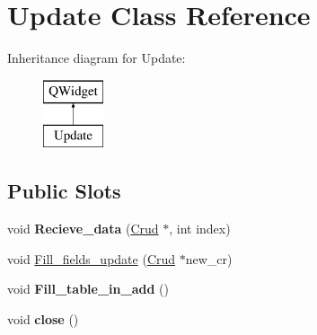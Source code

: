 \hypertarget{class_update}{}\section{Update Class Reference}
\label{class_update}
Inheritance diagram for Update\+:\begin{figure}[H]
\begin{center}
\leavevmode
\includegraphics[height=2.000000cm]{class_update}
\end{center}
\end{figure}
\subsection*{Public Slots}
\begin{DoxyCompactItemize}
\item 
\mbox{\label{class_update_ae6de4372b926ff536ea11f00f77d468f}} 
void {\bfseries Recieve\+\_\+data} (\mbox{\hyperlink{class_crud}{Crud}} $\ast$, int index)
\item 
void \mbox{\hyperlink{class_update_a4bd50fb5eb9794ac0922b886f5f7808d}{Fill\+\_\+fields\+\_\+update}} (\mbox{\hyperlink{class_crud}{Crud}} $\ast$new\+\_\+cr)
\item 
\mbox{\label{class_update_a14f2a495d449ac46fbfc427934c6be19}} 
void {\bfseries Fill\+\_\+table\+\_\+in\+\_\+add} ()
\item 
\mbox{\label{class_update_a9dac0a63442fe6ba995c099091eac5c4}} 
void {\bfseries close} ()
\end{DoxyCompactItemize}
